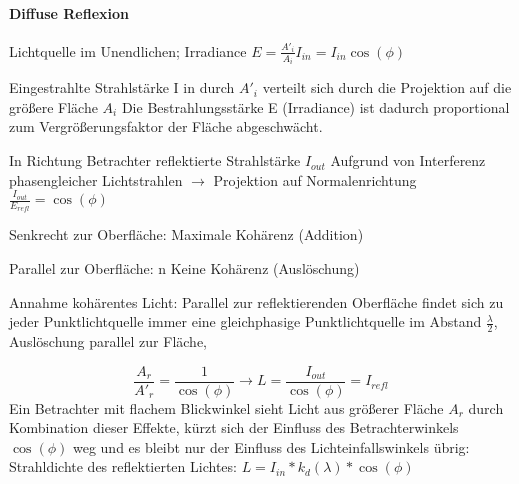\documentclass[landscape]{article}
\begin{document}
\begin{multicols}{3}
  \paragraph{Diffuse Reflexion}
  
  Lichtquelle im Unendlichen; Irradiance $E=\frac{A'_i}{A_i}I_{in}=I_{in}\cos(\phi)$
  
  Eingestrahlte Strahlstärke I in durch $A'_i$ verteilt sich durch die Projektion auf die größere Fläche $A_i$ Die Bestrahlungsstärke E (Irradiance) ist dadurch proportional zum Vergrößerungsfaktor der Fläche abgeschwächt.
  
  In Richtung Betrachter reflektierte Strahlstärke $I_{out}$ Aufgrund von Interferenz phasengleicher Lichtstrahlen $\rightarrow$ Projektion auf Normalenrichtung $\frac{I_{out}}{E_{refl}}=\cos(\phi)$
  \begin{itemize*}
    \item Senkrecht zur Oberfläche: Maximale Kohärenz (Addition)
    \item Parallel zur Oberfläche: n Keine Kohärenz (Auslöschung)
  \end{itemize*}
  
  
  Annahme kohärentes Licht: Parallel zur reflektierenden Oberfläche findet sich zu jeder Punktlichtquelle immer eine gleichphasige Punktlichtquelle im Abstand $\frac{\lambda}{2}$, Auslöschung parallel zur Fläche,
  
  
  $$\frac{A_r}{A'_r}=\frac{1}{\cos(\phi)} \rightarrow L=\frac{I_{out}}{\cos(\phi)}=I_{refl}$$
  Ein Betrachter mit flachem Blickwinkel sieht Licht aus größerer Fläche $A_r$ durch Kombination dieser Effekte, kürzt sich der Einfluss des Betrachterwinkels $\cos(\phi)$ weg und es bleibt nur der Einfluss des Lichteinfallswinkels übrig: Strahldichte des reflektierten Lichtes: $L=I_{in}*k_d(\lambda)*\cos(\phi)$
  

\end{multicols}
\end{document}
